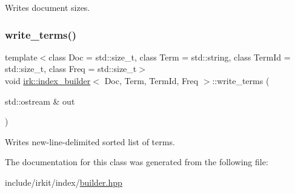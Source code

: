 Writes document sizes. 

\mbox{\label{classirk_1_1index__builder_a7bd993ab3ceb6527e622187bde86c93a}} 
\subsubsection{\texorpdfstring{write\+\_\+terms()}{write\_terms()}}
{\footnotesize\ttfamily template$<$class Doc  = std\+::size\+\_\+t, class Term  = std\+::string, class Term\+Id  = std\+::size\+\_\+t, class Freq  = std\+::size\+\_\+t$>$ \\
void \mbox{\hyperlink{classirk_1_1index__builder}{irk\+::index\+\_\+builder}}$<$ Doc, Term, Term\+Id, Freq $>$\+::write\+\_\+terms (\begin{DoxyParamCaption}\item[{std\+::ostream \&}]{out }\end{DoxyParamCaption})\hspace{0.3cm}{\ttfamily [inline]}}



Writes new-\/line-\/delimited sorted list of terms. 



The documentation for this class was generated from the following file\+:\begin{DoxyCompactItemize}
\item 
include/irkit/index/\mbox{\hyperlink{builder_8hpp}{builder.\+hpp}}\end{DoxyCompactItemize}
